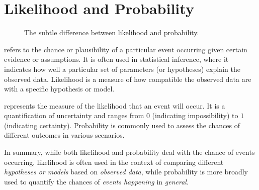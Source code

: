 \documentclass[
  a4paper,
]{scrbook}
\providecommand{\tightlist}{%
  \setlength{\itemsep}{0pt}\setlength{\parskip}{0pt}}\usepackage{longtable,booktabs,array}
\let\olddescription\description
\let\endolddescription\enddescription
\renewenvironment{description}{
          \begin{spacing}{1.5}\olddescription
        }{
          \endolddescription\end{spacing}
        }
\begin{document}
\section{Likelihood and Probability}\label{likelihood-and-probability}

\begin{figure}[ht]


\caption{\label{fig-lp}The subtle difference between likelihood and
probability.}

\end{figure}%

\begin{description}
\tightlist
\item[Likelihood]
refers to the chance or plausibility of a particular event occurring
given certain evidence or assumptions. It is often used in statistical
inference, where it indicates how well a particular set of parameters
(or hypotheses) explain the observed data. Likelihood is a measure of
how compatible the observed data are with a specific hypothesis or
model.
\item[Probability]
represents the measure of the likelihood that an event will occur. It is
a quantification of uncertainty and ranges from \(0\) (indicating
impossibility) to \(1\) (indicating certainty). Probability is commonly
used to assess the chances of different outcomes in various scenarios.
\end{description}

In summary, while both likelihood and probability deal with the chance
of events occurring, likelihood is often used in the context of
comparing different \emph{hypotheses or models} based on \emph{observed
data}, while probability is more broadly used to quantify the chances of
\emph{events happening} in \emph{general}.
\end{document}
